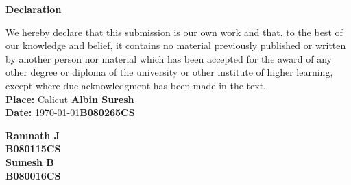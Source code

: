 \begin{center}%
\Large\bf{Declaration}%
\end{center}%
{We hereby declare that this submission is our own work and that, to the best of
our knowledge and belief, it contains no material previously published or written
by another person nor material which has been accepted for the award of any
other degree or diploma of the university or other institute of higher learning,
except where due acknowledgment has been made in the text.}%
\\[1cm]%
{\bf Place:} Calicut \hfill {\large \bf Albin Suresh} \\
{\bf Date:} \today \hfill {\large \bf B080265CS}
\begin{flushright}
\vspace{2.0cm}
{\large \bf Ramnath J}\\
{\large \bf B080115CS}\\
\vspace{2.0cm}
{\large \bf Sumesh B}\\
{\large \bf B080016CS}\\
\end{flushright}

